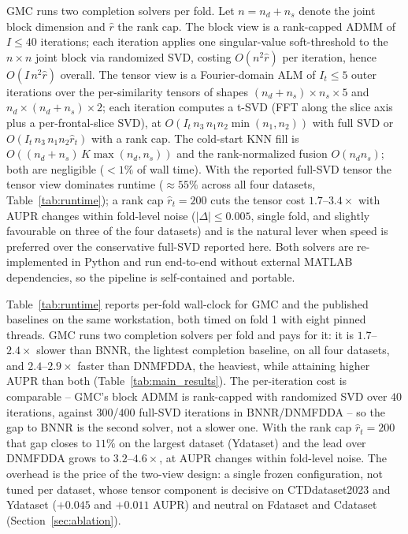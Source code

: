 \documentclass[webpdf,modern,large]{oup-authoring-template}
\begin{document}
GMC runs two completion solvers per fold. Let $n=n_d+n_s$ denote the joint block dimension and $\hat r$ the rank cap. The block view is a rank-capped ADMM of $I\le 40$ iterations; each iteration applies one singular-value soft-threshold to the $n\times n$ joint block via randomized SVD, costing $O(n^2\hat r)$ per iteration, hence $O(I\,n^2\hat r)$ overall. The tensor view is a Fourier-domain ALM of $I_t\le 5$ outer iterations over the per-similarity tensors of shapes $(n_d+n_s)\times n_s\times 5$ and $n_d\times(n_d+n_s)\times 2$; each iteration computes a t-SVD (FFT along the slice axis plus a per-frontal-slice SVD), at $O(I_t\,n_3\,n_1 n_2\min(n_1,n_2))$ with full SVD or $O(I_t\,n_3\,n_1 n_2\hat r_t)$ with a rank cap. The cold-start KNN fill is $O((n_d+n_s)\,K\max(n_d,n_s))$ and the rank-normalized fusion $O(n_d n_s)$; both are negligible ($<\!1\%$ of wall time). With the reported full-SVD tensor the tensor view dominates runtime ($\approx\!55\%$ across all four datasets, Table~\ref{tab:runtime}); a rank cap $\hat r_t=200$ cuts the tensor cost $1.7$--$3.4\times$ with AUPR changes within fold-level noise ($|\Delta|\le 0.005$, single fold, and slightly favourable on three of the four datasets) and is the natural lever when speed is preferred over the conservative full-SVD reported here. Both solvers are re-implemented in Python and run end-to-end without external MATLAB dependencies, so the pipeline is self-contained and portable.

Table~\ref{tab:runtime} reports per-fold wall-clock for GMC and the published baselines on the same workstation, both timed on fold 1 with eight pinned threads. GMC runs two completion solvers per fold and pays for it: it is $1.7$--$2.4\times$ slower than BNNR, the lightest completion baseline, on all four datasets, and $2.4$--$2.9\times$ faster than DNMFDDA, the heaviest, while attaining higher AUPR than both (Table~\ref{tab:main_results}). The per-iteration cost is comparable -- GMC's block ADMM is rank-capped with randomized SVD over $40$ iterations, against $300$/$400$ full-SVD iterations in BNNR/DNMFDDA -- so the gap to BNNR is the second solver, not a slower one. With the rank cap $\hat r_t=200$ that gap closes to $11\%$ on the largest dataset (Ydataset) and the lead over DNMFDDA grows to $3.2$--$4.6\times$, at AUPR changes within fold-level noise. The overhead is the price of the two-view design: a single frozen configuration, not tuned per dataset, whose tensor component is decisive on CTDdataset2023 and Ydataset ($+0.045$ and $+0.011$ AUPR) and neutral on Fdataset and Cdataset (Section~\ref{sec:ablation}).
\end{document}
